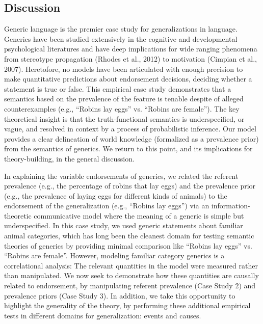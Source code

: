 \documentclass[english,,man,floatsintext]{apa6}
\theoremstyle{definition}
\theoremstyle{definition}
\theoremstyle{definition}
\theoremstyle{remark}
\begin{document}
\hypertarget{discussion}{%
\subsection{Discussion}\label{discussion}}

Generic language is the premier case study for generalizations in
language. Generics have been studied extensively in the cognitive and
developmental psychological literatures and have deep implications for
wide ranging phenomena from stereotype propagation (Rhodes et al., 2012)
to motivation (Cimpian et al., 2007). Heretofore, no models have been
articulated with enough precision to make quantitative predictions about
endorsement decisions, deciding whether a statement is true or false.
This empirical case study demonstrates that a semantics based on the
prevalence of the feature is tenable despite of alleged counterexamples
(e.g., \enquote{Robins lay eggs} vs. \enquote{Robins are female}). The
key theoretical insight is that the truth-functional semantics is
underspecified, or vague, and resolved in context by a process of
probabilistic inference. Our model provides a clear delineation of world
knowledge (formalized as a prevalence prior) from the semantics of
generics. We return to this point, and its implications for
theory-building, in the general discussion.

In explaining the variable endorsements of generics, we related the
referent prevalence (e.g., the percentage of robins that lay eggs) and
the prevalence prior (e.g., the prevalence of laying eggs for different
kinds of animals) to the endorsement of the generalization (e.g.,
\enquote{Robins lay eggs}) via an information-theoretic communicative
model where the meaning of a generic is simple but underspecified. In
this case study, we used generic statements about familiar animal
categories, which has long been the cleanest domain for testing semantic
theories of generics by providing minimal comparison like
\enquote{Robins lay eggs} vs. \enquote{Robins are female}. However,
modeling familiar category generics is a correlational analysis: The
relevant quantities in the model were measured rather than manipulated.
We now seek to demonstrate how these quantities are causally related to
endorsement, by manipulating referent prevalence (Case Study 2) and
prevalence priors (Case Study 3). In addition, we take this opportunity
to highlight the generality of the theory, by performing these
additional empirical tests in different domains for generalization:
events and causes.
\end{document}
